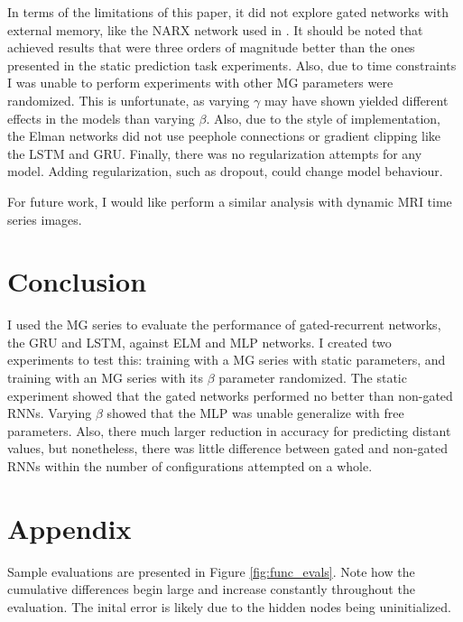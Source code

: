 \documentclass[11pt]{article}
\begin{document}
In terms of the limitations of this paper, it did not explore gated
networks with external memory, like the NARX network used in
\cite{Farsa}. It should be noted that \cite{Farsa} achieved results
that were three orders of magnitude better than the ones presented in the static
prediction task experiments. Also, due to
time constraints I was unable to perform experiments with other MG
parameters were randomized. This is unfortunate, as varying $\gamma$
may have shown yielded different effects in the models than varying $\beta$. Also, due to
the style of implementation, the Elman networks did not use peephole
connections or gradient clipping like the LSTM and GRU. Finally, there
was no regularization attempts for any model. Adding regularization, such as dropout, could change model behaviour.

For future work, I would like perform a similar analysis with dynamic
MRI time series images.

 \section{Conclusion}
I used the MG series to evaluate the performance of gated-recurrent
networks, the GRU and LSTM, against ELM and MLP networks. I created
two  experiments to test this: training with a MG series with
static parameters, and training with an MG series with its $\beta$
parameter randomized. The static experiment showed that the gated
networks performed no better than non-gated RNNs. Varying $\beta$  showed that the MLP was unable generalize with free
parameters. Also, there much larger reduction in accuracy for
predicting distant values, but nonetheless, there was little
difference between gated and non-gated RNNs within the number
of configurations attempted on a whole.

\section*{Appendix}
 Sample evaluations are presented
  in Figure \ref{fig:func_evals}.  Note how the cumulative
   differences begin large and increase constantly throughout the
   evaluation. The inital error is likely due to the hidden nodes being uninitialized.
\end{document}
